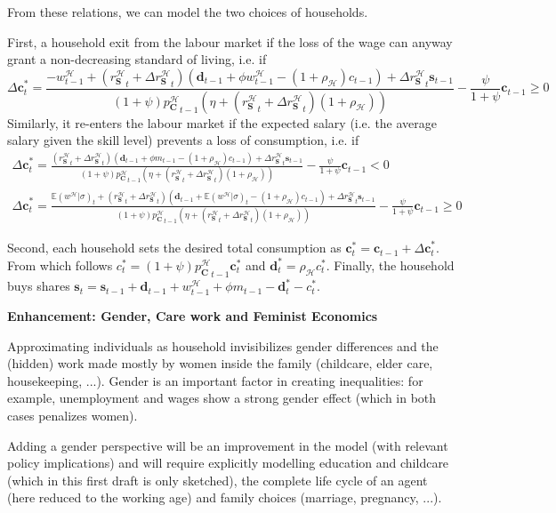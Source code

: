 \documentclass[a4paper, headings=standardclasses]{scrartcl}
\newenvironment{enh}[1][]{\begin{framed}\noindent\textbf{Enhancement: #1}\par}{\end{framed}}
\begin{document}
From these relations, we can model the two choices of households.

First, a household exit from the labour market if the loss of the wage can anyway grant a non-decreasing standard of living, i.e. if
$$ {\Delta \mathbf{c}}^*_t = \frac{-w^{\mathcal{H}}_{t-1} + ({r^{\mathcal{H}}_\mathbf{S}}_t + {\Delta r^{\mathcal{H}}_\mathbf{S}}_{t})(\mathbf{d}_{t-1} + \phi w^{\mathcal{H}}_{t-1} - (1+\rho_{\mathcal{H}}) c_{t-1}) + {\Delta r^{\mathcal{H}}_\mathbf{S}}_{t} \mathbf{s}_{t-1}}{(1+\psi){p^{\mathcal{H}}_\mathbf{C}}_{t-1}(\eta +  ({r^{\mathcal{H}}_\mathbf{S}}_t + {\Delta r^{\mathcal{H}}_\mathbf{S}}_{t})(1+\rho_{\mathcal{H}}))} - \frac{\psi}{1+\psi}{\mathbf{c}_{t-1}} \ge 0$$
Similarly, it re-enters the labour market if the expected salary (i.e. the average salary given the skill level) prevents a loss of consumption, i.e. if
\begin{multline*}
    {\Delta \mathbf{c}}^*_t = \frac{({r^{\mathcal{H}}_\mathbf{S}}_t + {\Delta r^{\mathcal{H}}_\mathbf{S}}_{t})(\mathbf{d}_{t-1} + \phi m_{t-1} - (1+\rho_{\mathcal{H}}) c_{t-1}) + {\Delta r^{\mathcal{H}}_\mathbf{S}}_{t} \mathbf{s}_{t-1}}{(1+\psi){p^{\mathcal{H}}_\mathbf{C}}_{t-1}(\eta +  ({r^{\mathcal{H}}_\mathbf{S}}_t + {\Delta r^{\mathcal{H}}_\mathbf{S}}_{t})(1+\rho_{\mathcal{H}}))} - \frac{\psi}{1+\psi}{\mathbf{c}_{t-1}} < 0 \\
    {\Delta \mathbf{c}}^*_t = \frac{{\mathbb{E}(w^{\mathcal{H}}|\sigma)}_{t} + ({r^{\mathcal{H}}_\mathbf{S}}_t + {\Delta r^{\mathcal{H}}_\mathbf{S}}_{t})(\mathbf{d}_{t-1} + {\mathbb{E}(w^{\mathcal{H}}|\sigma)}_{t} - (1+\rho_{\mathcal{H}}) c_{t-1}) + {\Delta r^{\mathcal{H}}_\mathbf{S}}_{t} \mathbf{s}_{t-1}}{(1+\psi){p^{\mathcal{H}}_\mathbf{C}}_{t-1}(\eta +  ({r^{\mathcal{H}}_\mathbf{S}}_t + {\Delta r^{\mathcal{H}}_\mathbf{S}}_{t})(1+\rho_{\mathcal{H}}))} - \frac{\psi}{1+\psi}{\mathbf{c}_{t-1}} \ge 0
\end{multline*}

Second, each household sets the desired total consumption as $\mathbf{c}^*_t = \mathbf{c}_{t-1} + {\Delta \mathbf{c}}^*_t$. From which follows $c^*_t = (1+\psi) {p^{\mathcal{H}}_\mathbf{C}}_{t-1} \mathbf{c}^*_t$ and $\mathbf{d}^*_t = \rho_{\mathcal{H}} c^*_t$. Finally, the household buys shares $\mathbf{s}_t = \mathbf{s}_{t-1} + \mathbf{d}_{t-1} + w^{\mathcal{H}}_{t-1} + \phi m_{t-1} - \mathbf{d}^*_t - c^*_t$.

\begin{enh}[Gender, Care work and Feminist Economics]
    Approximating individuals as household invisibilizes gender differences and the (hidden) work made mostly by women inside the family (childcare, elder care, housekeeping, ...).
    Gender is an important factor in creating inequalities: for example, unemployment and wages show a strong gender effect (which in both cases penalizes women).

    Adding a gender perspective will be an improvement in the model (with relevant policy implications) and will require explicitly modelling education and childcare (which in this first draft is only sketched), the complete life cycle of an agent (here reduced to the working age) and family choices (marriage, pregnancy, ...).
\end{enh}
\end{document}
